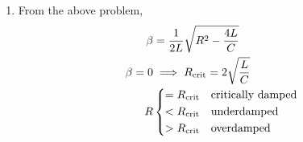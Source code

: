 \begin{enumerate}
    \item From the above problem,
          \begin{align}
              \beta     & = \frac{1}{2L} \sqrt{R^{2} - \frac{4L}{C}}               \\
              \beta = 0 & \implies R_{\text{crit}} = 2\sqrt{\frac{L}{C}}           \\
              R         & \begin{dcases}
                              = R_{\text{crit}} & \text{critically damped} \\
                              < R_{\text{crit}} & \text{underdamped}       \\
                              > R_{\text{crit}} & \text{overdamped}        \\
                          \end{dcases}
          \end{align}


\end{enumerate}
